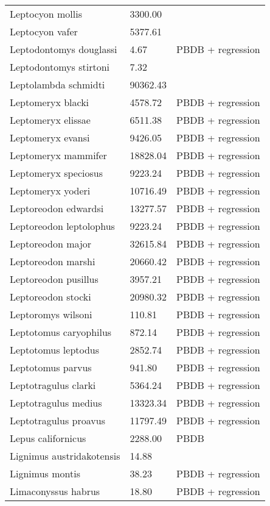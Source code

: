 \begin{center}
\begin{longtable}{p{} p{} p{} }
  Leptocyon mollis & 3300.00 & \cite{McKenna2011} \\ 
  Leptocyon vafer & 5377.61 & \cite{Tomiya2013} \\ 
  Leptodontomys douglassi & 4.67 & PBDB + regression \\ 
  Leptodontomys stirtoni & 7.32 & \cite{Stock1937} \\ 
  Leptolambda schmidti & 90362.43 & \cite{Zack2005} \\ 
  Leptomeryx blacki & 4578.72 & PBDB + regression \\ 
  Leptomeryx elissae & 6511.38 & PBDB + regression \\ 
  Leptomeryx evansi & 9426.05 & PBDB + regression \\ 
  Leptomeryx mammifer & 18828.04 & PBDB + regression \\ 
  Leptomeryx speciosus & 9223.24 & PBDB + regression \\ 
  Leptomeryx yoderi & 10716.49 & PBDB + regression \\ 
  Leptoreodon edwardsi & 13277.57 & PBDB + regression \\ 
  Leptoreodon leptolophus & 9223.24 & PBDB + regression \\ 
  Leptoreodon major & 32615.84 & PBDB + regression \\ 
  Leptoreodon marshi & 20660.42 & PBDB + regression \\ 
  Leptoreodon pusillus & 3957.21 & PBDB + regression \\ 
  Leptoreodon stocki & 20980.32 & PBDB + regression \\ 
  Leptoromys wilsoni & 110.81 & PBDB + regression \\ 
  Leptotomus caryophilus & 872.14 & PBDB + regression \\ 
  Leptotomus leptodus & 2852.74 & PBDB + regression \\ 
  Leptotomus parvus & 941.80 & PBDB + regression \\ 
  Leptotragulus clarki & 5364.24 & PBDB + regression \\ 
  Leptotragulus medius & 13323.34 & PBDB + regression \\ 
  Leptotragulus proavus & 11797.49 & PBDB + regression \\ 
  Lepus californicus & 2288.00 & PBDB \\ 
  Lignimus austridakotensis & 14.88 & \cite{Tomiya2013} \\ 
  Lignimus montis & 38.23 & PBDB + regression \\ 
  Limaconyssus habrus & 18.80 & PBDB + regression \\ 

\end{longtable}
\end{center}
